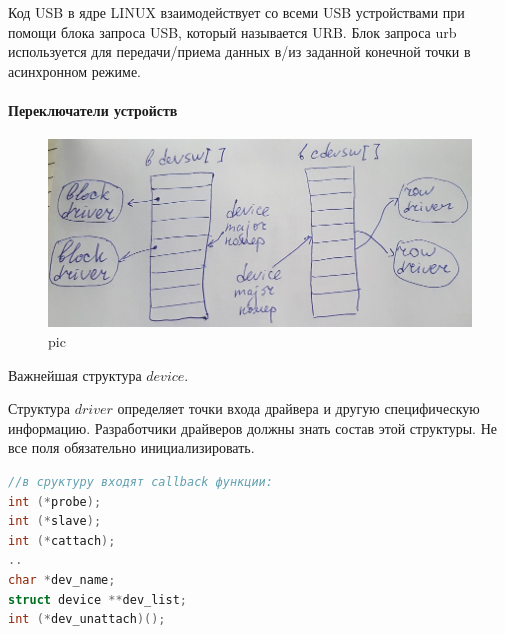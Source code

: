  

Код USB в ядре LINUX взаимодействует со всеми USB устройствами при помощи блока запроса USB, который называется URB. Блок запроса urb используется для передачи/приема данных в/из заданной конечной точки в асинхронном режиме.

\paragraph{Переключатели устройств}

\begin{figure}[H]
  \centering
  \includegraphics[width=\textwidth]{pic/1.png}
  \caption{pic}
\end{figure}

Важнейшая структура $device$. 

Структура $driver$ определяет точки входа драйвера и другую специфическую информацию. Разработчики драйверов должны знать состав этой структуры. Не все поля обязательно инициализировать.

\begin{lstlisting}[language=c]
//в сруктуру входят callback функции:
int (*probe);
int (*slave);
int (*cattach);
..
char *dev_name;
struct device **dev_list;
int (*dev_unattach)();
\end{lstlisting}